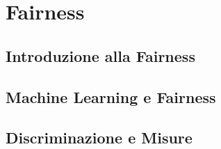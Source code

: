 \chapter{Fairness}

\section{Introduzione alla Fairness}

\section{Machine Learning e Fairness}

\section{Discriminazione e Misure}


